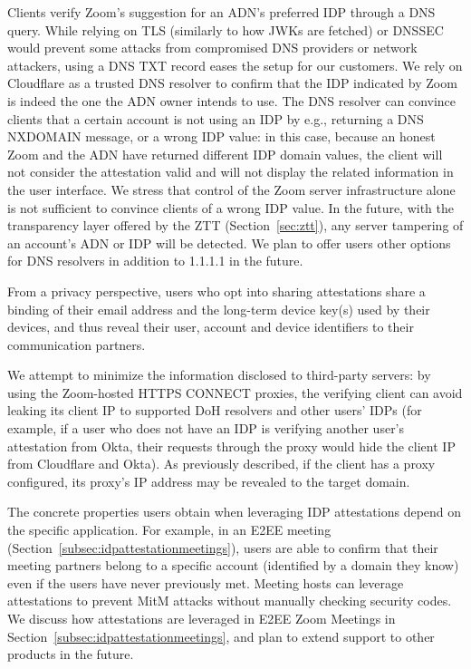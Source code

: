 Clients verify Zoom's suggestion for an ADN's preferred IDP through a DNS 
query. While relying on TLS (similarly to how JWKs are fetched) or DNSSEC 
would prevent some attacks from compromised DNS providers or network 
attackers, using a DNS TXT record eases the setup for our customers. We
rely on Cloudflare as a trusted DNS resolver to confirm that the IDP indicated
by Zoom is indeed the one the ADN owner intends to use. The DNS resolver can
convince clients that a certain account is not using an IDP by e.g., returning a
DNS NXDOMAIN message, or a wrong IDP value: in this case, because an honest Zoom
and the ADN have returned different IDP domain values, the client will not
consider the attestation valid and will not display the related information in
the user interface. We stress that control of the Zoom server infrastructure
alone is not sufficient to convince clients of a wrong IDP value. In the future, with the
transparency layer offered by the ZTT (Section~\ref{sec:ztt}), any server
tampering of an account’s ADN or IDP will be detected. We plan to offer users
other options for DNS resolvers in addition to 1.1.1.1 in the future.

From a privacy perspective, users who opt into sharing attestations share a
binding of their email address and the long-term device key(s) used by their
devices, and thus reveal their user, account and device identifiers to their
communication partners. 

We attempt to minimize the information disclosed to third-party servers: by
using the Zoom-hosted HTTPS CONNECT proxies, the verifying client can avoid
leaking its client IP to supported DoH resolvers and other users' IDPs (for
example, if a user who does not have an IDP is verifying another user's
attestation from Okta, their requests through the proxy would hide the client IP
from Cloudflare and Okta). As previously described, if the client has a proxy configured, 
its proxy's IP address may be revealed to the target domain.

The concrete properties users obtain when leveraging IDP attestations depend on the specific
application. For example, in an E2EE meeting (Section~\ref{subsec:idpattestationmeetings}), users
are able to confirm that their meeting partners belong to a specific account (identified by a domain
they know) even if the users have never previously met. Meeting hosts can leverage attestations to
prevent MitM attacks without manually checking security codes. We discuss how attestations are
leveraged in E2EE Zoom Meetings in Section~\ref{subsec:idpattestationmeetings}, and plan to extend
support to other products in the future.